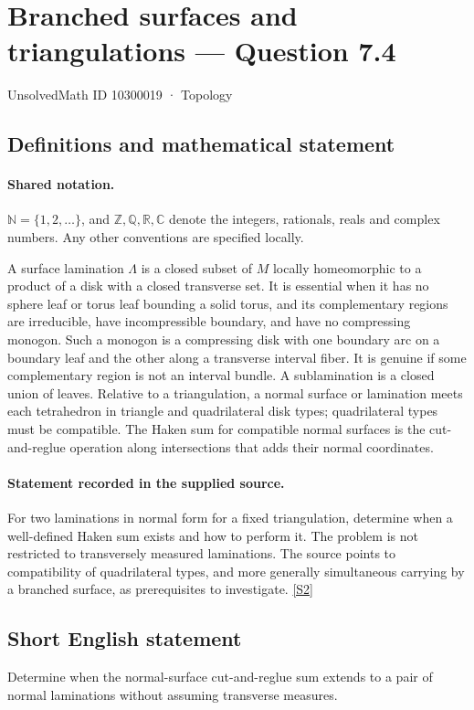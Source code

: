 \documentclass[11pt]{article}
\newcommand{\sref}[2]{\hyperlink{source:#1:#2}{[S#2]}}
\begin{document}
\setcounter{section}{10300018}
\section{Branched surfaces and triangulations — Question 7.4}\label{10300019}
{\small\sffamily UnsolvedMath ID 10300019 · Topology}
\subsection{Definitions and mathematical statement}

\paragraph{Shared notation.}$\mathbb N=\{1,2,\ldots\}$, and $\mathbb Z,\mathbb Q,\mathbb R,\mathbb C$ denote the integers, rationals, reals and complex numbers. Any other conventions are specified locally.


A surface lamination $\Lambda$ is a closed subset of $M$ locally homeomorphic to a product of a disk with a closed transverse set. It is essential when it has no sphere leaf or torus leaf bounding a solid torus, and its complementary regions are irreducible, have incompressible boundary, and have no compressing monogon. Such a monogon is a compressing disk with one boundary arc on a boundary leaf and the other along a transverse interval fiber. It is genuine if some complementary region is not an interval bundle. A sublamination is a closed union of leaves. Relative to a triangulation, a normal surface or lamination meets each tetrahedron in triangle and quadrilateral disk types; quadrilateral types must be compatible. The Haken sum for compatible normal surfaces is the cut-and-reglue operation along intersections that adds their normal coordinates.
\paragraph{Statement recorded in the supplied source.}
For two laminations in normal form for a fixed triangulation, determine when a well-defined Haken sum exists and how to perform it. The problem is not restricted to transversely measured laminations. The source points to compatibility of quadrilateral types, and more generally simultaneous carrying by a branched surface, as prerequisites to investigate. \sref{10300019}{2}
\subsection{Short English statement}
Determine when the normal-surface cut-and-reglue sum extends to a pair of normal laminations without assuming transverse measures.
\end{document}
